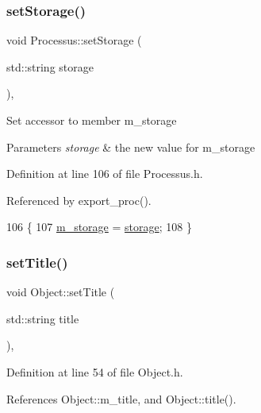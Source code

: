 \subsubsection{\texorpdfstring{set\+Storage()}{setStorage()}}
{\footnotesize\ttfamily void Processus\+::set\+Storage (\begin{DoxyParamCaption}\item[{std\+::string}]{storage }\end{DoxyParamCaption})\hspace{0.3cm}{\ttfamily [inline]}, {\ttfamily [inherited]}}

Set accessor to member m\+\_\+storage 
\begin{DoxyParams}{Parameters}
{\em storage} & the new value for m\+\_\+storage \\
\hline
\end{DoxyParams}


Definition at line 106 of file Processus.\+h.



Referenced by export\+\_\+proc().


\begin{DoxyCode}
106                                       \{
107     \hyperlink{classProcessus_a132b1e71f72327e5a87f0a168c7b6325}{m\_storage} = \hyperlink{classProcessus_a33fa1a0b54a636e5cdd680669fd9ea51}{storage};
108   \}
\end{DoxyCode}
\mbox{\label{classObject_a89557dbbad5bcaa02652f5d7fa35d20f}} 
\subsubsection{\texorpdfstring{set\+Title()}{setTitle()}}
{\footnotesize\ttfamily void Object\+::set\+Title (\begin{DoxyParamCaption}\item[{std\+::string}]{title }\end{DoxyParamCaption})\hspace{0.3cm}{\ttfamily [inline]}, {\ttfamily [inherited]}}



Definition at line 54 of file Object.\+h.



References Object\+::m\+\_\+title, and Object\+::title().




